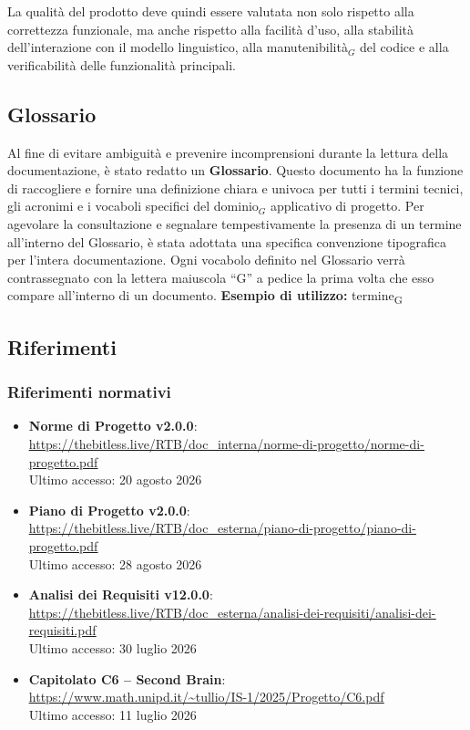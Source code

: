 \documentclass[a4paper, 10pt, colorlinks=true, linkcolor=black, urlcolor=blue, citecolor=blue, hidelinks]{article}
\newcommand{\reflink}[1]{{\footnotesize\underline{\url{#1}}}}
\begin{document}
La qualità del prodotto deve quindi essere valutata non solo rispetto alla correttezza funzionale, ma anche rispetto alla facilità d'uso, alla stabilità dell'interazione con il modello linguistico, alla manutenibilità$_G$ del codice e alla verificabilità delle funzionalità principali.

\subsection{Glossario}
Al fine di evitare ambiguità e prevenire incomprensioni durante la lettura della documentazione, è stato redatto un \textbf{Glossario}. Questo documento ha la funzione di raccogliere e fornire una definizione chiara e univoca per tutti i termini tecnici, gli acronimi e i vocaboli specifici del dominio$_G$ applicativo di progetto.
Per agevolare la consultazione e segnalare tempestivamente la presenza di un termine all'interno del Glossario, è stata adottata una specifica convenzione tipografica per l'intera documentazione. 
Ogni vocabolo definito nel Glossario verrà contrassegnato con la lettera maiuscola ``G'' a pedice la prima volta che esso compare all'interno di un documento.
\vspace{0.3cm}
\noindent \textbf{Esempio di utilizzo:} 
termine\textsubscript{G} %

\subsection{Riferimenti}

\subsubsection{Riferimenti normativi}

\begin{itemize}
    \item \textbf{Norme di Progetto v2.0.0}: \\
    \reflink{https://thebitless.live/RTB/doc_interna/norme-di-progetto/norme-di-progetto.pdf} \\
    Ultimo accesso: 20 agosto 2026

    \item \textbf{Piano di Progetto v2.0.0}: \\
    \reflink{https://thebitless.live/RTB/doc_esterna/piano-di-progetto/piano-di-progetto.pdf} \\
    Ultimo accesso: 28 agosto 2026

    \item \textbf{Analisi dei Requisiti v12.0.0}: \\
    \reflink{https://thebitless.live/RTB/doc_esterna/analisi-dei-requisiti/analisi-dei-requisiti.pdf} \\
    Ultimo accesso: 30 luglio 2026

    \item \textbf{Capitolato C6 -- Second Brain}: \\
    \reflink{https://www.math.unipd.it/~tullio/IS-1/2025/Progetto/C6.pdf} \\
    Ultimo accesso: 11 luglio 2026
\end{itemize}
\end{document}

